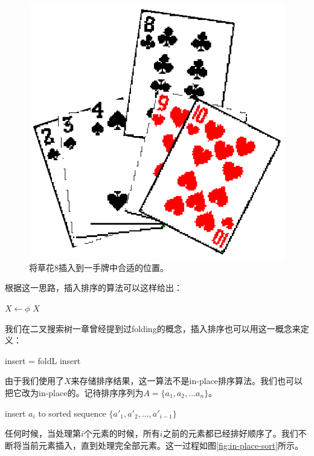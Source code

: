 \documentclass[UTF8]{article}
\begin{document}
\begin{figure}[htbp]
  \centering
  \includegraphics[scale=0.5]{img/hand-of-cards.eps}
  \caption{将草花8插入到一手牌中合适的位置。}
  \label{fig:hand-of-cards}
\end{figure}

根据这一思路，插入排序的算法可以这样给出：

\begin{algorithmic}
  \State $X \gets \phi$
    \State {}
  \EndFor
  \State \Return $X$
\EndFunction
\end{algorithmic}

我们在二叉搜索树一章曾经提到过folding的概念，插入排序也可以用这一概念来定义：

\be
  insert = foldL \quad insert \quad \phi
\ee

由于我们使用了$X$来存储排序结果，这一算法不是in-place排序算法。我们也可以把它改为in-place的。记待排序序列为$A = \{a_1, a_2, ... a_n\}$。

\begin{algorithmic}
    \State insert $a_i$ to sorted sequence $\{a'_1, a'_2, ..., a'_{i-1} \}$
  \EndFor
\EndFunction
\end{algorithmic}

任何时候，当处理第$i$个元素的时候，所有$i$之前的元素都已经排好顺序了。我们不断将当前元素插入，直到处理完全部元素。这一过程如图\ref{fig:in-place-sort}所示。
\end{document}
